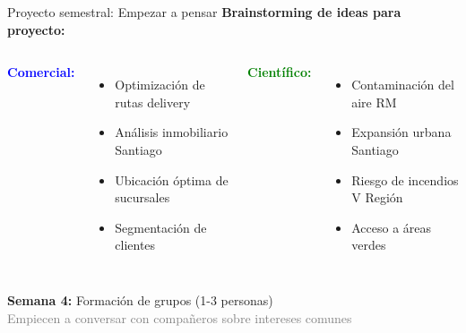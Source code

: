 \documentclass[10pt]{beamer}
\begin{document}
\begin{frame}{Proyecto semestral: Empezar a pensar}
    \textbf{Brainstorming de ideas para proyecto:}
    
    \begin{columns}
        \textcolor{blue}{ \textbf{Comercial:}}
        \begin{itemize}
            \item Optimización de rutas delivery
            \item Análisis inmobiliario Santiago
            \item Ubicación óptima de sucursales
            \item Segmentación de clientes
        \end{itemize}
        
        \textcolor{green}{ \textbf{Científico:}}
        \begin{itemize}
            \item Contaminación del aire RM
            \item Expansión urbana Santiago
            \item Riesgo de incendios V Región
            \item Acceso a áreas verdes
        \end{itemize}
    \end{columns}
    
    \vspace{0.5cm}
    \begin{center}
        \begin{tcolorbox}[colframe=usachblue, width=10cm]
            \centering
            \textbf{Semana 4:} Formación de grupos (1-3 personas)\\
            \textcolor{gray}{\small Empiecen a conversar con compañeros sobre intereses comunes}
        \end{tcolorbox}
    \end{center}
\end{frame}
\end{document}
